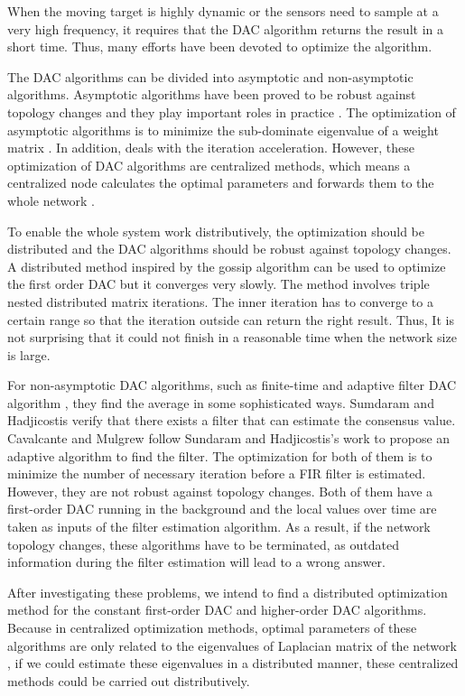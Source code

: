 When the moving target is highly dynamic or the sensors need to sample
at a very high frequency, it requires that  the DAC algorithm returns
the result in a short time. Thus, many efforts have been devoted to
optimize the algorithm.

The DAC algorithms can be divided into asymptotic and non-asymptotic
algorithms. Asymptotic algorithms have been proved to be robust against
 topology changes and they play important roles in practice \cite{Ren2007}.
 The optimization of asymptotic algorithms is to minimize the sub-dominate
eigenvalue of a weight matrix \cite{Asensio-Marco2012}\cite{Xiao2004}\cite{Xiong2010}.
 In addition, \cite{Kokiopoulou2007} deals with the iteration acceleration.
However, these optimization of DAC algorithms are centralized methods,
which means a centralized node calculates the optimal parameters and
forwards them to the whole network \cite{Xiong2010}. 

To enable the whole system work distributively, the optimization should
be distributed and the DAC algorithms should be robust against topology
changes. A distributed method inspired by the gossip algorithm \cite{Boyd2006}
can be used to optimize the first order DAC but it converges very
slowly.   The method involves triple nested distributed matrix iterations.
The inner iteration has to converge to a certain range so that the
iteration outside can return the right result. Thus, It is not surprising
that it could not finish in a reasonable time when the network size
is large.

For non-asymptotic DAC algorithms, such as finite-time \cite{Sundaram2007}
and adaptive filter DAC algorithm \cite{Cavalcante2010}, they find
the average in some sophisticated ways. Sumdaram and Hadjicostis \cite{Sundaram2007}
verify that there exists a filter that can estimate the consensus
value. Cavalcante and Mulgrew \cite{Cavalcante2010} follow Sundaram
and Hadjicostis's work to propose an adaptive algorithm to find the
filter. The optimization for both of them is to minimize the number
of necessary iteration before a FIR filter is estimated. However,
they are not robust against topology changes. Both of them have a
first-order DAC running in the background and the local values over
time are taken as inputs of the filter estimation algorithm. As a
result, if the network topology changes, these algorithms have to
be terminated, as outdated information during the filter estimation
will lead to a wrong answer.



After investigating these problems, we intend to find a distributed
optimization method for the constant first-order DAC and higher-order
DAC algorithms. Because in centralized optimization methods, optimal
parameters of these algorithms are only related to the eigenvalues
of Laplacian matrix of the network \cite{Xiong2010}, if we could
estimate these eigenvalues in a distributed manner, these centralized
methods could be carried out distributively. 

